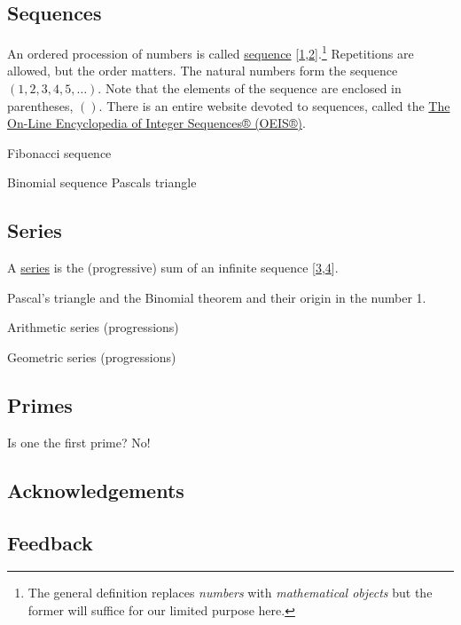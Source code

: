 \documentclass[
  a4paper,
]{article}
\begin{document}
\hypertarget{sequences}{%
\subsection{Sequences}\label{sequences}}

An ordered procession of numbers is called
\href{https://en.wikipedia.org/w/index.php?title=Sequence\&oldid=1177801065}{sequence}
{[}\protect\hyperlink{ref-wikisequence}{1},\protect\hyperlink{ref-wolframsequence}{2}{]}.\footnote{The
  general definition replaces \emph{numbers} with \emph{mathematical
  objects} but the former will suffice for our limited purpose here.}
Repetitions are allowed, but the order matters. The natural numbers form
the sequence \((1, 2, 3, 4, 5, \ldots)\). Note that the elements of the
sequence are enclosed in parentheses, \(()\). There is an entire website
devoted to sequences, called the \href{https://oeis.org/}{The On-Line
Encyclopedia of Integer Sequences® (OEIS®)}.

Fibonacci sequence

Binomial sequence Pascals triangle

\hypertarget{series}{%
\subsection{Series}\label{series}}

A \href{https://mathworld.wolfram.com/Series.html}{series} is the
(progressive) sum of an infinite sequence
{[}\protect\hyperlink{ref-wikiseries}{3},\protect\hyperlink{ref-wolframseries}{4}{]}.

Pascal's triangle and the Binomial theorem and their origin in the
number 1.

Arithmetic series (progressions)

Geometric series (progressions)

\hypertarget{primes}{%
\subsection{Primes}\label{primes}}

Is one the first prime? No!

\hypertarget{acknowledgements}{%
\subsection{Acknowledgements}\label{acknowledgements}}

\hypertarget{feedback}{%
\subsection{Feedback}\label{feedback}}
\end{document}
